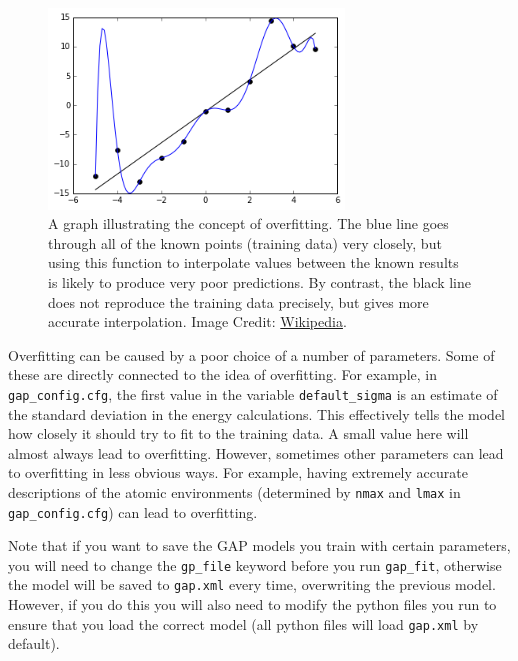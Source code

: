 \documentclass{article}
\begin{document}
\begin{figure}[t]

\centering

\includegraphics[width=0.7\textwidth]{Overfitted_Data.png}
\caption{A graph illustrating the concept of overfitting. The blue line goes through all of the known points (training data) very closely, but using this function to interpolate values between the known results is likely to produce very poor predictions. By contrast, the black line does not reproduce the training data precisely, but gives more accurate interpolation. Image Credit: \href{https://en.wikipedia.org/wiki/Overfitting}{Wikipedia}.}

\end{figure}

Overfitting can be caused by a poor choice of a number of parameters. Some of these are directly connected to the idea of overfitting. For example, in \verb|gap_config.cfg|, the first value in the variable \verb|default_sigma| is an estimate of the standard deviation in the energy calculations. This effectively tells the model how closely it should try to fit to the training data. A small value here will almost always lead to overfitting. However, sometimes other parameters can lead to overfitting in less obvious ways. For example, having extremely accurate descriptions of the atomic environments (determined by \verb|nmax| and \verb|lmax| in \verb|gap_config.cfg|) can lead to overfitting.

Note that if you want to save the GAP models you train with certain parameters, you will need to change the \verb|gp_file| keyword before you run \verb|gap_fit|, otherwise the model will be saved to \verb|gap.xml| every time, overwriting the previous model. However, if you do this you will also need to modify the python files you run to ensure that you load the correct model (all python files will load \verb|gap.xml| by default).
\end{document}
